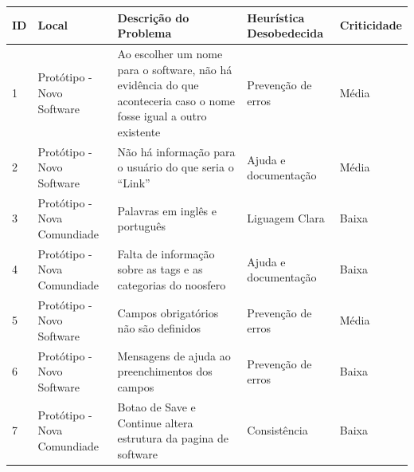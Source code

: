 \begin{table}[d]
\begin{tabular}{|l|p{3cm}|p{6cm}|p{3cm}|l|}
\hline
\textbf{ID} & \textbf{Local} & \textbf{Descrição do Problema}                                                                                     & \textbf{Heurística Desobedecida} & \textbf{Criticidade} \\ \hline
1           & Protótipo - Novo Software                 & Ao escolher um nome para o software, não há evidência do que aconteceria caso o nome fosse igual a outro existente & Prevenção de erros               & Média                \\ \hline
2           & Protótipo - Novo Software                 & Não há informação para o usuário do que seria o ``Link''                                                             & Ajuda e documentação             & Média                \\ \hline
3           & Protótipo - Nova Comundiade               & Palavras em inglês e português                                                                                     & Liguagem Clara                   & Baixa                \\ \hline
4           & Protótipo - Nova Comundiade               & Falta de informação sobre as tags e as categorias do noosfero                                                      & Ajuda e documentação             & Baixa                \\ \hline
5           & Protótipo - Novo Software                 & Campos obrigatórios não são definidos                                                                              & Prevenção de erros               & Média                \\ \hline
6           & Protótipo - Novo Software    & Mensagens de ajuda ao preenchimentos dos campos                                                                    & Prevenção de erros               & Baixa                \\ \hline
7           & Protótipo - Nova Comundiade               & Botao de Save e Continue altera estrutura da pagina de software                                                    & Consistência                     & Baixa                \\ \hline
\end{tabular}
\end{table}



